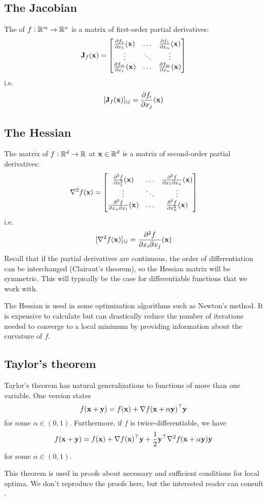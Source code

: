 \subsection{The Jacobian}
The  of $f : \mathbb{R}^m \to \mathbb{R}^n$ is a matrix of first-order partial derivatives:
\[\mathbf{J}_f(\mathbf{x}) = \begin{bmatrix}
	{\pdv{f_1}{x_1}}(\mathbf{x}) & \hdots & {\pdv{f_1}{x_n}}(\mathbf{x}) \\
	\vdots & \ddots & \vdots \\
	{\pdv{f_m}{x_1}}(\mathbf{x}) & \hdots & {\pdv{f_m}{x_n}}(\mathbf{x})
\end{bmatrix}\]
i.e.
\[[\mathbf{J}_f(\mathbf{x})]_{ij} = {\pdv{f_i}{x_j}}(\mathbf{x})\]

\subsection{The Hessian}
The  matrix of $f : \mathbb{R}^d \to \mathbb{R}$ at $\mathbf{x} \in \mathbb{R}^d$ is a matrix of second-order partial derivatives:
\[\nabla^2 f(\mathbf{x}) = \begin{bmatrix}
	{\pdv[2]{f}{x_1}}(\mathbf{x}) & \hdots & {\pdv{f}{x_1}{x_n}}(\mathbf{x}) \\
	\vdots & \ddots & \vdots \\
	{\pdv{f}{x_n}{x_1}}(\mathbf{x}) & \hdots & {\pdv[2]{f}{x_n}}(\mathbf{x})
\end{bmatrix}\]
i.e.
\[[\nabla^2 f(\mathbf{x})]_{ij} = {\pdv{f}{x_i}{x_j}}(\mathbf{x})\]
Recall that if the partial derivatives are continuous, the order of differentiation can be interchanged (Clairaut's theorem), so the Hessian matrix will be symmetric.
This will typically be the case for differentiable functions that we work with.

The Hessian is used in some optimization algorithms such as Newton's method.
It is expensive to calculate but can drastically reduce the number of iterations needed to converge to a local minimum by providing information about the curvature of $f$.

\subsection{Taylor's theorem}
Taylor's theorem has natural generalizations to functions of more than one variable.
One version states
\[f(\mathbf{x} + \mathbf{y}) = f(\mathbf{x}) + \nabla f(\mathbf{x} + \alpha\mathbf{y})^\top\mathbf{y}\]
for some $\alpha \in (0,1)$.
Furthermore, if $f$ is twice-differentiable, we have
\[f(\mathbf{x} + \mathbf{y}) = f(\mathbf{x}) + \nabla f(\mathbf{x})^\top\mathbf{y} + \frac{1}{2}\mathbf{y}^\top\nabla^2f(\mathbf{x}+\alpha\mathbf{y})\mathbf{y}\]
for some $\alpha \in (0,1)$.

This theorem is used in proofs about necessary and sufficient conditions for local optima.
We don't reproduce the proofs here, but the interested reader can consult \cite{numopt}.

